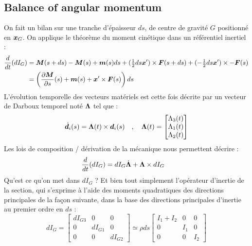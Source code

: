 \subsection{Balance of angular momentum}
On fait un bilan sur une tranche d'épaisseur $ds$, de centre de gravité $G$ positionné en $\boldsymbol{x}_G$. On applique le théorème du moment cinétique dans un référentiel inertiel :
\begin{equation}
	\begin{aligned}
		\frac{d}{dt}(dI_G) &=
		\boldsymbol{M}(s+ds)-\boldsymbol{M}(s) + \boldsymbol{m}(s)ds
		+ (\tfrac{1}{2}ds\boldsymbol{x}')\times \boldsymbol{F}(s+ds) + (-\tfrac{1}{2}ds\boldsymbol{x}')\times -\boldsymbol{F}(s)\\
		&= \left(\frac{\partial \boldsymbol{M}}{\partial s}(s)+\boldsymbol{m}(s) + \boldsymbol{x}'\times \boldsymbol{F}(s)\right)ds
	\end{aligned}
\end{equation}
L'évolution temporelle des vecteurs matériels est cette fois décrite par un vecteur de Darboux temporel noté $\boldsymbol{\Lambda}$ tel que :
\begin{equation}
	\dot{\boldsymbol{d}_{i}}(s) =\boldsymbol{\Lambda}(t) \times \boldsymbol{d}_i(s)	\quad,\quad
	\boldsymbol{\Lambda}(t)
	=
	\begin{bmatrix}
		\Lambda_3(t) \\
		\Lambda_1(t) \\
		\Lambda_2(t)
	\end{bmatrix}
\end{equation}
Les lois de composition / dérivation de la mécanique nous permettent décrire :
\begin{equation}
	\begin{aligned}
		\frac{d}{dt}(dI_G) &= dI_G\dot{\boldsymbol{\Lambda}} + \boldsymbol{\Lambda}\times dI_G
	\end{aligned}
\end{equation}
Qu'est ce qu'on met dans $dI_G$ ? Et bien tout simplement l'opérateur d'inertie de la section, qui s'exprime à l'aide des moments quadratiques des directions principales de la façon suivante, dans la base des directions principales d'inertie au premier ordre en $ds$ :
\begin{equation}
	dI_G =
	 \begin{bmatrix}
			dI_{G3} & 0 & 0 \\
			0 & dI_{G1} & 0 \\
			0 & 0 & dI_{G2}
	\end{bmatrix}
	\simeq \rho ds
		\begin{bmatrix}
			I_1 + I_2 & 0 & 0 \\
			0 & I_1 & 0 \\
			0 & 0 & I_2
		\end{bmatrix}
\end{equation}
